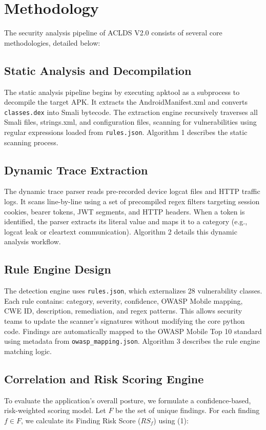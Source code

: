 \documentclass[conference]{
IEEEtran}
\begin{document}
\section{Methodology}
The security analysis pipeline of ACLDS V2.0 consists of several core methodologies, detailed below:

\subsection{Static Analysis and Decompilation}
The static analysis pipeline begins by executing apktool as a subprocess to decompile the target APK. It extracts the AndroidManifest.xml and converts \texttt{classes.dex} into Smali bytecode. The extraction engine recursively traverses all Smali files, strings.xml, and configuration files, scanning for vulnerabilities using regular expressions loaded from \texttt{rules.json}. Algorithm 1 describes the static scanning process.

\subsection{Dynamic Trace Extraction}
The dynamic trace parser reads pre-recorded device logcat files and HTTP traffic logs. It scans line-by-line using a set of precompiled regex filters targeting session cookies, bearer tokens, JWT segments, and HTTP headers. When a token is identified, the parser extracts its literal value and maps it to a category (e.g., logcat leak or cleartext communication). Algorithm 2 details this dynamic analysis workflow.

\subsection{Rule Engine Design}
The detection engine uses \texttt{rules.json}, which externalizes 28 vulnerability classes. Each rule contains: category, severity, confidence, OWASP Mobile mapping, CWE ID, description, remediation, and regex patterns. This allows security teams to update the scanner's signatures without modifying the core python code. Findings are automatically mapped to the OWASP Mobile Top 10 standard using metadata from \texttt{owasp\_mapping.json}. Algorithm 3 describes the rule engine matching logic.

\subsection{Correlation and Risk Scoring Engine}
To evaluate the application's overall posture, we formulate a confidence-based, risk-weighted scoring model. Let $F$ be the set of unique findings. For each finding $f \in F$, we calculate its Finding Risk Score ($RS_f$) using (1):
\end{document}
